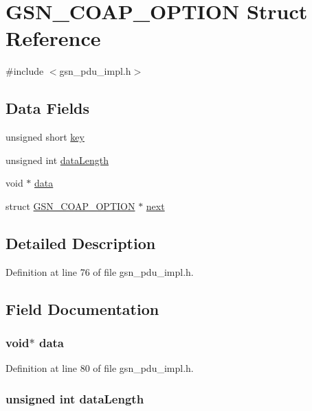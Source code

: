 \hypertarget{a00041}{
\section{GSN\_\-COAP\_\-OPTION Struct Reference}
\label{a00041}
}


{\ttfamily \#include $<$gsn\_\-pdu\_\-impl.h$>$}

\subsection*{Data Fields}
\begin{DoxyCompactItemize}
\item 
unsigned short \hyperlink{a00041_ad42a2de4cc8381513f980278161372bb}{key}
\item 
unsigned int \hyperlink{a00041_af068ff181ce87a3e65ba4bada0ea21c6}{dataLength}
\item 
void $\ast$ \hyperlink{a00041_a735984d41155bc1032e09bece8f8d66d}{data}
\item 
struct \hyperlink{a00041}{GSN\_\-COAP\_\-OPTION} $\ast$ \hyperlink{a00041_a2aab167b023fbc15a158b9bf6d1effe3}{next}
\end{DoxyCompactItemize}


\subsection{Detailed Description}


Definition at line 76 of file gsn\_\-pdu\_\-impl.h.



\subsection{Field Documentation}
\hypertarget{a00041_a735984d41155bc1032e09bece8f8d66d}{
\subsubsection[{data}]{\setlength{\rightskip}{0pt plus 5cm}void$\ast$ {\bf data}}}
\label{a00041_a735984d41155bc1032e09bece8f8d66d}


Definition at line 80 of file gsn\_\-pdu\_\-impl.h.

\hypertarget{a00041_af068ff181ce87a3e65ba4bada0ea21c6}{
\subsubsection[{dataLength}]{\setlength{\rightskip}{0pt plus 5cm}unsigned int {\bf dataLength}}}
\label{a00041_af068ff181ce87a3e65ba4bada0ea21c6}


